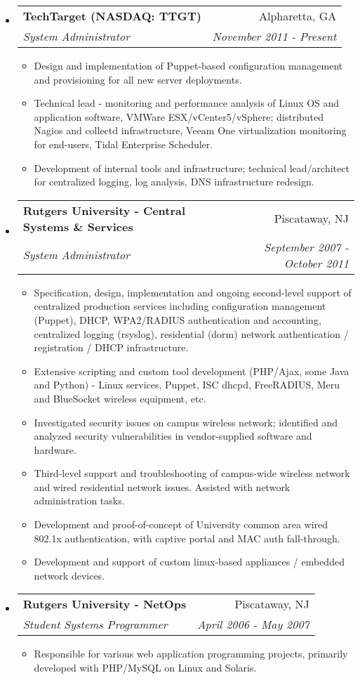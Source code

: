 \documentclass[letterpaper,11pt]{article}
\makeatletter
\newcommand{\resitem}[1]{\item #1 \vspace{-2pt}}
\newcommand{\ressubheading}[4]{
\begin{tabular*}{7.0in}{l@{\extracolsep{\fill}}r}
		\textbf{#1} & #2 \\
		\textit{#3} & \textit{#4} \\
\end{tabular*}\vspace{-6pt}}
\makeatother
\begin{document}
\begin{itemize}
\item
	\ressubheading{TechTarget  (NASDAQ: TTGT)}{Alpharetta, GA}{System Administrator}{November 2011 - Present}
	\begin{itemize}
		\resitem{Design and implementation of Puppet-based configuration management and provisioning for all new server deployments.}
                \resitem{Technical lead - monitoring and performance analysis of Linux OS and application software, VMWare ESX/vCenter5/vSphere; distributed Nagios and collectd infrastructure, Veeam One virtualization monitoring for end-users, Tidal Enterprise Scheduler.}
                \resitem{Development of internal tools and infrastructure; technical lead/architect for centralized logging, log analysis, DNS infrastructure redesign.}
	\end{itemize}

\item
	\ressubheading{Rutgers University - Central Systems \&
          Services}{Piscataway, NJ}{System Administrator}{September 2007 - October 2011}
	\begin{itemize}
                \resitem{Specification, design, implementation and ongoing second-level support of centralized production services including configuration management (Puppet), DHCP, WPA2/RADIUS authentication and accounting, centralized logging (rsyslog), residential (dorm) network authentication / registration / DHCP infrastructure.}
                \resitem{Extensive scripting and custom tool development
                  (PHP/Ajax, some Java and Python)
                  - Linux services, Puppet, ISC dhcpd, FreeRADIUS, Meru and BlueSocket wireless equipment, etc.}
                \resitem{Investigated security issues on campus wireless network; identified and analyzed security vulnerabilities in vendor-supplied software and hardware.}
                \resitem{Third-level support and troubleshooting of campus-wide wireless network and wired residential network issues. Assisted with network administration tasks.}
		\resitem{Development and proof-of-concept of University common area wired 802.1x authentication, with captive portal and MAC auth fall-through.}
		\resitem{Development and support of custom linux-based appliances / embedded network devices.}
	\end{itemize}

\item
	\ressubheading{Rutgers University - NetOps}{Piscataway, NJ}{Student Systems Programmer}{April 2006 - May 2007}
	\begin{itemize}
		\resitem{Responsible for various web application programming projects, primarily developed with
                  PHP/MySQL on Linux and Solaris.}
	\end{itemize}

\end{itemize}
\end{document}
